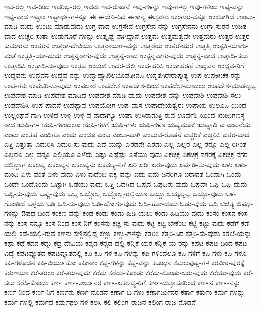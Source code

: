 {ಇವ-ರಲ್ಲಿ
ಇವ-ರಿಂದ
ಇವರಿಬ್ಬ-ರಲ್ಲಿ
ಇವರು
ಇವ-ರೊಡನೆ
ಇವು-ಗಳನ್ನು
ಇವು-ಗಳಲ್ಲಿ
ಇವು-ಗಳಿಂದ
ಇಷ್ಟ-ವನ್ನು
ಇಷ್ಟ-ವಾದ
ಇಷ್ಟಾಂ
ಇಷ್ಟಾರ್ಥ-ಗಳನ್ನೂ
ಈ
ಈಡೇರಿ-ಸಿದ
ಈಶಾನ್ಯ
ಈಶ್ವರನು
ಉಂಗುರ-ವನ್ನೂ
ಉಂಟಾಗಿದೆ
ಉಂಟು-ಮಾಡಿ-ದುದು
ಉಂಟು-ಮಾಡುವುದು
ಉಗ್ರ-ವಾದ
ಉಗ್ರಸೇನ
ಉಗ್ರಸೇನ-ನನ್ನು
ಉಗ್ರಸೇನನು
ಉಗ್ರಾ-ಸುರನ
ಉಚಿತ-ವಾದ
ಉಚ್ಚರಿ-ಸುತ್ತಾ
ಉಡುಗೊರೆ-ಗಳನ್ನು
ಉತ್ಕೃಷ್ಟ-ನಾಗಿದ್ದಾನೆ
ಉತ್ತಮ
ಉತ್ತಮತ್ವವೇ
ಉತ್ತಮರು
ಉತ್ತರ
ಉತ್ತರ-ಕುಮಾರನು
ಉತ್ತರನ
ಉತ್ತರಾ-ದೇವಿಯು
ಉತ್ತರಾಯಣ-ವನ್ನು
ಉತ್ತರೆಯ
ಉತ್ತರೆ-ಯರ
ಉತ್ಪತ್ತಿ
ಉತ್ಪತ್ತಿ-ಯಾಗು-ವಂತೆ
ಉತ್ಪತ್ತಿ-ಯಾ-ದುದು
ಉತ್ಪನ್ನರಾಗು-ವುದು
ಉತ್ಪನ್ನ-ರಾದ
ಉತ್ಪನ್ನವಾಗು-ವುದು
ಉತ್ಪನ್ನ-ವಾದ
ಉತ್ಪಾದಿ-ಸಲು
ಉತ್ಪಾದಿಸಿ
ಉತ್ಪಾದಿ-ಸು-ವುದು
ಉತ್ಸವ
ಉದಂಕ
ಉದರ-ದಲ್ಲಿ
ಉದ-ಹರಿಸಿ
ಉದಾಹರಣೆ
ಉದ್ದವನ
ಉದ್ದವ-ನಿಗೆ
ಉದ್ದವನು
ಉದ್ಧವನ
ಉದ್ಧವ-ನನ್ನು
ಉದ್ವಾಹ್ಯಾಖಿಲಭೂಪತೀನಪಿ
ಉನ್ನತಗಿರೇರಾಪ್ಲುತ್ಯ
ಉಪ
ಉಪಕೀಚಕ-ರನ್ನು
ಉಪ-ಗತಃ
ಉಪಚರಿ-ಸು-ವುದು
ಉಪಚಾರ
ಉಪದೇಶ
ಉಪದೇಶ-ದಿಂದ
ಉಪದೇಶ-ಮಾಡಲು
ಉಪದೇಶ-ಮಾಡಲ್ಪಟ್ಟ
ಉಪದೇಶ-ಮಾಡಿ
ಉಪದೇಶ-ಮಾಡಿದ
ಉಪದೇಶ-ಮಾಡಿ-ದುದು
ಉಪದೇಶ-ವನ್ನು
ಉಪದೇಶಿ
ಉಪದೇಶಿ-ಸಲು
ಉಪದೇಶಿಸಿ
ಉಪ-ಪಾದನೆ
ಉಪಪ್ಪಾವ
ಉಪಯೋಗ
ಉಪ-ವಾಸ
ಉಪಾದೇಯತ್ವಈ
ಉಪಾಯ
ಉಲೂಪಿ-ಯಿಂದ
ಉಲ್ಲಂಘನೆ-ಗಾಗಿ
ಉಳಿದ
ಉಳ್ಳ
ಉಳ್ಳ-ವ-ನಾದಾಗ್ಯೂ
ಉಷಾ
ಉಸಿರಾಡುತ್ತಿ-ರುವ
ಊರ್ವಶಿ-ಯಿಂದ
ಋಜುಗಣಸ್ಥ-ರಾದ
ಋಷಿ-ಗಳ
ಋಷಿ-ಗಳಿಂದಲೂ
ಋಷಿ-ಗಳಿಗೆ
ಋಷಿ-ಗಳು
ಋಷಿ-ಗಳೂ
ಋಷ್ಯಮೂಕ
ಋಷ್ಯಾದಿ
ಎ
ಎಂಟನೆಯ
ಎಂಟು
ಎಂತಹ
ಎಂದಿಗೂ
ಎಂದು
ಎಂದೂ
ಎಂಬ
ಎಂಬು-ದಾಗಿ
ಎಂಬುವ-ರೊಡನೆ
ಎಚ್ಚರಿಕೆ
ಎಚ್ಚರಿಸಿ
ಎತ್ತರ-ವಾದ
ಎತ್ತಿ
ಎತ್ತುತ್ತಾ
ಎದುರಿಸಿ
ಎದುರಿ-ಸು-ವುದು
ಎದೆ-ಯನ್ನು
ಎರಡನೇ
ಎರಡು
ಎಲ್ಲ
ಎಲ್ಲರ
ಎಲ್ಲ-ರನ್ನೂ
ಎಲ್ಲ-ರಿಗಿಂತ
ಎಲ್ಲರೂ
ಎಲ್ಲ-ವನ್ನೂ
ಎಲ್ಲಿಯೂ
ಎಳೆದು
ಎಷ್ಟು
ಎಷ್ಟೆಷ್ಟು
ಎಸೆಯು-ವುದು
ಏಕಚಕ್ರ
ಏಕಚಕ್ರ-ನಗರಕ್ಕೆ
ಏಕಚಕ್ರ-ನಗರ-ದಲ್ಲಿದ್ದಾಗ
ಏಕಲವ್ಯ
ಏಕಲವ್ಯನ
ಏಕಲವ್ಯನು
ಏಕವಲ್ಯ-ನಿಗೆ
ಏರಿ
ಏರೀ
ಏರು-ವುದು
ಏರ್ಪಡಿ-ಸು-ವುದು
ಏಳು
ಏಳು-ಮಂದಿ
ಏಳು-ವಂತೆ
ಏಳು-ವುದು
ಏಳು-ವುದೆಂಬ
ಐಕ್ಯ-ವನ್ನು
ಐದು
ಐದು-ಜನರಿಗೂ
ಐರಾವತ
ಒಂದಾಗಿ
ಒಂದು
ಒಂದೇ
ಒಂದೊಂದು
ಒಟ್ಟಾಗಿ
ಒಡೆಯು-ವುದು
ಒತ್ತಿ
ಒದಗಿದ
ಒಪ್ಪದ
ಒಪ್ಪದಿರು-ವುದು
ಒಪ್ಪದೇ
ಒಪ್ಪಿ
ಒಪ್ಪಿ-ದುದು
ಒಪ್ಪಿ-ಸು-ವುದು
ಒಪ್ಪು-ವುದು
ಒಬ್ಬ
ಒಬ್ಬೊಬ್ಬ
ಒಬ್ಬೊಬ್ಬ-ರಲ್ಲಿಯೂ
ಒಯ್ದು
ಒಯ್ಯಲ್ಪಟ್ಟ
ಒಯ್ಯು-ವುದು
ಒಳ-ಗೊಂಡಿದೆ
ಒಳ್ಳೆಯ
ಓಡಿ
ಓಡಿ-ಸು-ವುದು
ಓಡಿ-ಹೋಗು-ವುದು
ಓಡಿ-ಹೋ-ದುದು
ಓಡು-ವುದು
ಓದಿ
ಔಚಿತ್ಯ
ಔಷಧ-ಗಳನ್ನು
ಔಷಧ-ದಿಂದ
ಕಂಕಣ-ವನ್ನು
ಕಂಡ
ಕಂಡು
ಕಂಡು-ಹಿಡಿ-ಯಲು
ಕಂಡು-ಹಿಡಿಯು-ವುದು
ಕಂಸಂ
ಕಂಸನ
ಕಂಸ-ನನ್ನು
ಕಂಸ-ನನ್ನೂ
ಕಂಸ-ನಿಂದ
ಕಂಸ-ನಿಗೆ
ಕಂಸನು
ಕಚ್ಚಿ-ಸು-ವುದು
ಕಟ್ಟ
ಕಟ್ಟ-ಬೇಕೆಂಬ
ಕಟ್ಟಿ
ಕಟ್ಟು-ವುದು
ಕಡೆಗೆ
ಕಡೆ-ಯಲ್ಲಿ
ಕಡೆ-ಯಲ್ಲಿ-ರುವ
ಕಣನು
ಕಣ್ಣಿನಲ್ಲಿದ್ದ
ಕಣ್ಣು
ಕಣ್ಣು-ಗಳನ್ನು
ಕತ್ತರಿಸಿ
ಕತ್ತರಿ-ಸಿದ
ಕತ್ತರಿ-ಸು-ವುದು
ಕತ್ತಲೆ-ಯನ್ನು
ಕಥಾ
ಕಥೆ
ಕದನ
ಕದ್ದು
ಕದ್ರ-ದೇವಿಯ
ಕನ್ನಡ
ಕನ್ನಡ-ದಲ್ಲಿ
ಕನ್ನಿಕೆ-ಯರ
ಕನ್ನಿಕೆ-ಯ-ರನ್ನು
ಕಪಟ
ಕಪಟ-ದಿಂದ
ಕಪಟ-ವಿದ್ಯೆ
ಕಪಟವ್ಯೂತದ
ಕಪಟವ್ಯೂತದಲ್ಲಿ
ಕಪಿ
ಕಪಿ-ಗಳ
ಕಪಿ-ಗಳನ್ನು
ಕಪಿ-ಗಳಿಂದಲೂ
ಕಪಿ-ಗಳಿಗೆ
ಕಪಿ-ಗಳು
ಕಪಿ-ಗಳೂ
ಕಪಿ-ಗಳೊಡನೆ
ಕಪಿ-ಭಿರ್ಯುತೋ
ಕಪೀನಾಂ
ಕಪ್ಪ-ಗಳನ್ನು
ಕಪ್ಪ-ವನ್ನು
ಕಬಂಧನ
ಕಮಲಪುಷ್ಪ-ಗಳ
ಕರವೀರ-ಪುರಕ್ಕೆ
ಕರುಣಯಾ
ಕರೆ-ತರಲು
ಕರೆ-ತರು-ವುದು
ಕರೆದು
ಕರೆದು-ಕೊಂಡು
ಕರೆದು-ಕೊಂಡು-ಬರು-ವುದು
ಕರೆಯು-ವುದು
ಕರೆ-ಸಲು
ಕರೆಸಿ-ಕೊಂಡು
ಕರ್ಣ
ಕರ್ಣ-ಅರ್ಜುನರ
ಕರ್ಣ-ಏಕಲವ್ಯ-ರಿಗೆ
ಕರ್ಣ-ದುಶ್ಯಾಸನರಿಂದ
ಕರ್ಣನ
ಕರ್ಣ-ನನ್ನು
ಕರ್ಣ-ನಿಂದ
ಕರ್ಣ-ನಿಗೆ
ಕರ್ಣನು
ಕರ್ಣ-ನೊಡನೆ
ಕರ್ಣಾ-ದಿ-ಗಳು
ಕರ್ಣಾರ್ಜುನರ
ಕರ್ತಾ
ಕರ್ತುಂ
ಕರ್ಮ-ಗಳನ್ನು
ಕರ್ಮ-ಗಳಲ್ಲಿ
ಕರ್ಮದ
ಕರ್ಮಫಲ-ಗಳ
ಕಲಸಿ
ಕಲಿ
ಕಲಿಂಗ-ರಾಜನ
ಕಲಿಂಗ-ರಾಜ-ನೊಡನೆ
}
